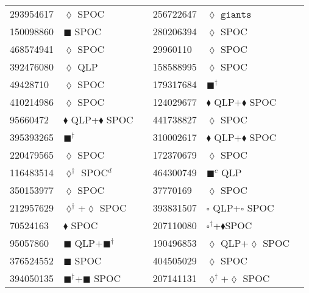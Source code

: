 \begin{longtable}{llrllr}
293954617 & $\lozenge$ SPOC & \cite{TIC_293954617} & 256722647 & $\lozenge$ $\texttt{giants}$ & \cite{TIC_348835438} \\
150098860 & $\blacksquare$ SPOC & \cite{TIC_150098860} & 280206394 & $\lozenge$ SPOC & \cite{TIC_280206394} \\
468574941 & $\lozenge$ SPOC & \cite{TIC_376637093} & 29960110 & $\lozenge$ SPOC & \cite{TIC_29960110} \\
392476080 & $\lozenge$ QLP & \cite{TIC_392476080} & 158588995 & $\lozenge$ SPOC & \cite{TIC_158588995} \\
49428710 & $\lozenge$ SPOC & \cite{TIC_219016883} & 179317684 & $\blacksquare^\dagger$ & \cite{TIC_179317684} \\
410214986 & $\lozenge$ SPOC & \cite{TIC_410214986} & 124029677 & $\blacklozenge$ QLP+$\blacklozenge$ SPOC & \cite{TIC_124029677} \\
95660472 & $\blacklozenge$ QLP+$\blacklozenge$ SPOC & \cite{TIC_156648452} & 441738827 & $\lozenge$ SPOC & \cite{TIC_441738827} \\
395393265 & $\blacksquare^\dagger$ & \cite{TIC_428787891} & 310002617 & $\blacklozenge$ QLP+$\blacklozenge$ SPOC & \cite{TIC_156648452} \\
220479565 & $\lozenge$ SPOC & \cite{TIC_220479565} & 172370679 & $\lozenge$ SPOC & \cite{TIC_172370679} \\
116483514 & $\lozenge^\dagger$ SPOC$^d$ & \cite{TIC_10837041} & 464300749 & $\blacksquare^c$ QLP & \cite{TIC_464300749} \\
350153977 & $\lozenge$ SPOC & \cite{TIC_350153977} & 37770169 & $\lozenge$ SPOC & \cite{TIC_70513361} \\
212957629 & $\lozenge^\dagger$+$\lozenge$ SPOC & \cite{TIC_212957629} & 393831507 & $\square$ QLP+$\square$ SPOC & \cite{TIC_393831507} \\
70524163 &$\blacklozenge$ SPOC & \cite{TIC_70524163} & 207110080 & $\square^\dagger$+$\blacklozenge$SPOC & \cite{TIC_207110080} \\
95057860 & $\blacksquare$ QLP+$\blacksquare^\dagger$ & \cite{TIC_95057860} & 190496853 & $\lozenge$ QLP+$\lozenge$ SPOC & \cite{TIC_83092282} \\
376524552 & $\blacksquare$ SPOC & \cite{TIC_428787891} & 404505029 & $\lozenge$ SPOC & \cite{TIC_404505029} \\
394050135 & $\blacksquare^\dagger$+$\blacksquare$ SPOC & \cite{TIC_428787891} & 207141131 & $\lozenge^\dagger$+$\lozenge$ SPOC & \cite{TIC_207141131} \\

\end{longtable}
